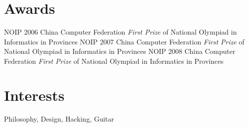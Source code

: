 \documentclass[]{friggeri-cv} %
\begin{document}

\section{Awards}

\begin{entrylist}
  {NOIP 2006}
  {China Computer Federation}
  {\emph{First Prize} of National Olympiad in Informatics in Provinces}
  {NOIP 2007}
  {China Computer Federation}
  {\emph{First Prize} of National Olympiad in Informatics in Provinces}
  {NOIP 2008}
  {China Computer Federation}
  {\emph{First Prize} of National Olympiad in Informatics in Provinces}
\end{entrylist}


\section{Interests}

Philosophy, Design, Hacking, Guitar
\end{document}
